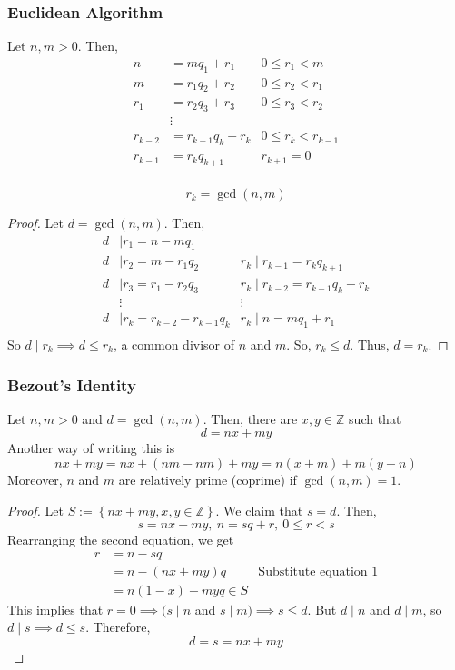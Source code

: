 \documentclass{report}
\newcommand{\Z}{\mathbb{Z}}
\newcommand{\theorem}[1]{\begin{tcolorbox}[title=\textit{Theorem}]{#1}\end{tcolorbox}}
\begin{document}
\subsubsection{Euclidean Algorithm}
Let $n, m > 0$. Then, 
\begin{align*}
    n &= mq_1 + r_1 & 0 \leq r_1 < m \\
    m &= r_1q_2 + r_2 & 0 \leq r_2 < r_1 \\
    r_1 &= r_2q_3 + r_3 & 0 \leq r_3 < r_2 \\
        &\vdots \\
    r_{k - 2} &= r_{k - 1}q_k + r_k & 0 \leq r_k < r_{k - 1} \\
    r_{k - 1} &= r_kq_{k + 1} & r_{k + 1} = 0 \\
\end{align*}

\theorem{
    \[r_k = \gcd(n, m)\]
}
\begin{proof}
    Let $d = \gcd(n, m)$. Then,
    \begin{align*}
        d &\mid r_1 = n - mq_1 \\
        d &\mid r_2 = m - r_1q_2 & r_k \mid r_{k - 1} = r_kq_{k + 1} \\
        d &\mid r_3 = r_1 - r_2q_3 & r_k \mid r_{k - 2} = r_{k - 1}q_k + r_k \\
          &\vdots & \vdots \\
        d &\mid r_k = r_{k - 2} - r_{k - 1}q_k & r_k \mid n = mq_1 + r_1 \\
    \end{align*}
    So $d \mid r_k \implies d \leq r_k$, a common divisor of $n$ and $m$. So, $r_k \leq d$. Thus,
    $d = r_k$.
\end{proof}


\subsubsection{Bezout's Identity}
\theorem{
    Let $n, m > 0$ and $d = \gcd(n, m)$. Then, there are $x, y \in \Z$ such that
    \[d = nx + my\]
    Another way of writing this is
    \[nx + my = nx + (nm - nm) + my = n(x + m) + m(y - n)\]
    Moreover, $n$ and $m$ are relatively prime (coprime) if $\gcd(n, m) = 1$.
}
\begin{proof}
    Let $S := \left\{ nx + my, x, y \in \Z \right\}$. We claim that $s = d$. Then,
    \[s = nx + my, \ n = sq + r, \ 0 \leq r < s\]
    Rearranging the second equation, we get
    \begin{align*}
        r &= n - sq \\
          &= n - (nx + my)q & \text{Substitute equation 1} \\
          &= n(1 - x) - myq \in S
    \end{align*}
    This implies that $r = 0 \implies (s \mid n$ and $s \mid m) \implies s \leq d$. But 
    $d \mid n$ and $d \mid m$, so $d \mid s \implies d \leq s$. Therefore,
    \[d = s = nx + my\]
\end{proof}
\end{document}
